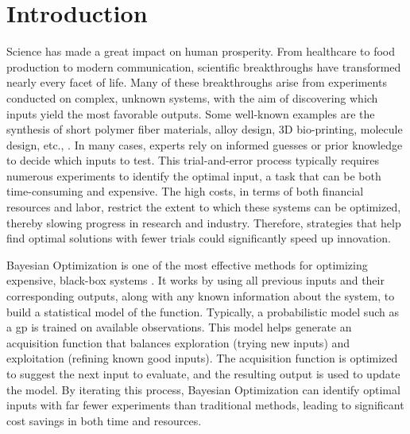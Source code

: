 \chapter{Introduction} %

\label{chap:introduction} %


\newcommand{\keyword}[1]{\textbf{#1}}
\newcommand{\tabhead}[1]{\textbf{#1}}
\newcommand{\code}[1]{\texttt{#1}}
\newcommand{\file}[1]{\texttt{\bfseries#1}}
\newcommand{\option}[1]{\texttt{\itshape#1}}

Science has made a great impact on human prosperity. From healthcare to food production to modern communication, scientific breakthroughs have transformed nearly every facet of life. Many of these breakthroughs arise from experiments conducted on complex, unknown systems, with the aim of discovering which inputs yield the most favorable outputs. Some well-known examples are the synthesis of short polymer fiber materials, alloy design, 3D bio-printing, molecule design, etc., \citep{greenhill2020bayesian, shahriari2015taking}. In many cases, experts rely on informed guesses or prior knowledge to decide which inputs to test. This trial-and-error process typically requires numerous experiments to identify the optimal input, a task that can be both time-consuming and expensive. The high costs, in terms of both financial resources and labor, restrict the extent to which these systems can be optimized, thereby slowing progress in research and industry. Therefore, strategies that help find optimal solutions with fewer trials could significantly speed up innovation.

Bayesian Optimization is one of the most effective methods for optimizing expensive, black-box systems \citep{mockus1978application, streltsov1999non}. It works by using all previous inputs and their corresponding outputs, along with any known information about the system, to build a statistical model of the function. Typically, a probabilistic model such as a \ac{gp} is trained on available observations. This model helps generate an acquisition function that balances exploration (trying new inputs) and exploitation (refining known good inputs). The acquisition function is optimized to suggest the next input to evaluate, and the resulting output is used to update the model. By iterating this process, Bayesian Optimization can identify optimal inputs with far fewer experiments than traditional methods, leading to significant cost savings in both time and resources. 

